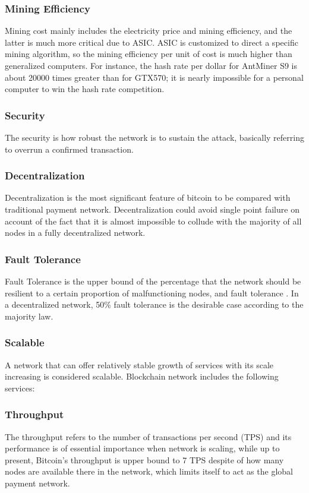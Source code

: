 \documentclass[a4paper,11pt]{article}
\begin{document}
\subsubsection*{Mining Efficiency}
Mining cost mainly includes the electricity price and mining efficiency, and the latter is much more critical due to ASIC. ASIC is customized to direct a specific mining algorithm, so the mining efficiency per unit of cost is much higher than generalized computers. For instance, the hash rate per dollar for AntMiner S9 is about 20000 times greater than for GTX570; it is nearly impossible for a personal computer to win the hash rate competition.

\subsubsection{Security}
The security is how robust the network is to sustain the attack, basically referring to overrun a confirmed transaction.

\subsubsection*{Decentralization}
Decentralization is the most significant feature of bitcoin to be compared with traditional payment network. Decentralization could avoid single point failure on account of the fact that it is almost impossible to collude with the majority of all nodes in a fully decentralized network.
\subsubsection*{Fault Tolerance}
Fault Tolerance is the upper bound of the percentage that the network should be resilient to a certain proportion of malfunctioning nodes, and fault tolerance . In a decentralized network, 50\% fault tolerance is the desirable case according to the majority law.

\subsubsection{Scalable}
A network that can offer relatively stable growth of services with its scale increasing is considered scalable. Blockchain network includes the following services:
\subsubsection*{Throughput}
The throughput refers to the number of transactions per second (TPS) and its performance is of essential importance when network is scaling, while up to present, Bitcoin’s throughput is upper bound to 7 TPS despite of  how many nodes are available there in the network, which limits itself to act as the global payment network.
\end{document}
